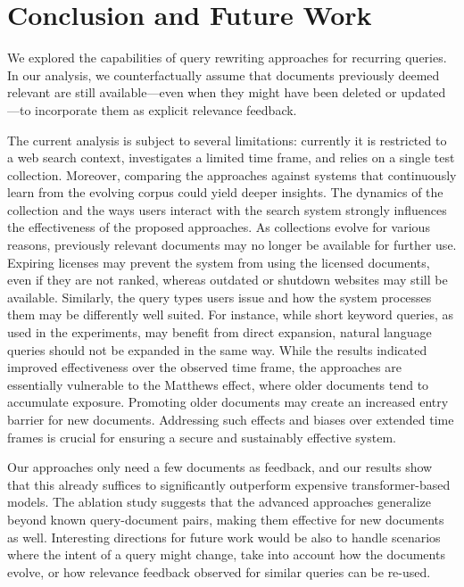 \section{Conclusion and Future Work}
We explored the capabilities of query rewriting approaches for recurring queries. In our analysis, we counterfactually assume that documents previously deemed relevant are still available---even when they might have been deleted or updated---to incorporate them as explicit relevance feedback. 

The current analysis is subject to several limitations: currently it is restricted to a web search context, investigates a limited time frame, and relies on a single test collection. Moreover, comparing the approaches against systems that continuously learn from the evolving corpus could yield deeper insights. 
The dynamics of the collection and the ways users interact with the search system strongly influences the effectiveness of the proposed approaches. As collections evolve for various reasons, previously relevant documents may no longer be available for further use. Expiring licenses may prevent the system from using the licensed documents, even if they are not ranked, whereas outdated or shutdown websites may still be available. Similarly, the query types users issue and how the system processes them may be differently well suited. For instance, while short keyword queries, as used in the experiments, may benefit from direct expansion, natural language queries should not be expanded in the same way.
While the results indicated improved effectiveness over the observed time frame, the approaches are essentially vulnerable to the Matthews effect, where older documents tend to accumulate exposure. Promoting older documents may create an increased entry barrier for new documents. Addressing such effects and biases over extended time frames is crucial for ensuring a secure and sustainably effective system. 

Our approaches only need a few documents as feedback, and our results show that this already suffices to significantly outperform expensive transformer-based models. The ablation study suggests that the advanced approaches generalize beyond known query-document pairs, making them effective for new documents as well.
Interesting directions for future work would be also to handle scenarios where the intent of a query might change, take into account how the documents evolve, or how relevance feedback observed for similar queries can be re-used.

